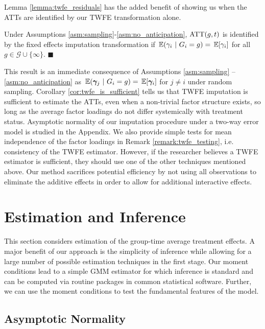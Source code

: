 \documentclass[12pt]{article}
\begin{document}
Lemma \ref{lemma:twfe_residuals} has the added benefit of showing us when the ATTs are identified by our TWFE transformation alone.
\begin{corollary}\label{cor:twfe_is_sufficient}
  Under Assumptions \ref{asm:sampling}-\ref{asm:no_anticipation}, $\text{ATT}(g,t)$ is identified by the fixed effects imputation transformation if $\expec{\gamma_i}{G_i=g} = \expec{\gamma_i}$ for all $g \in \mathcal{G} \cup \{\infty\}$. $\blacksquare$
\end{corollary}
This result is an immediate consequence of Assumptions \ref{asm:sampling} -- \ref{asm:no_anticipation} as $\expec{\bm \gamma_j}{G_i = g} = \expec{\bm \gamma_i}$ for $j \neq i$ under random sampling. 
Corollary \ref{cor:twfe_is_sufficient} tells us that TWFE imputation is sufficient to estimate the ATTs, even when a non-trivial factor structure exists, so long as the average factor loadings do not differ systemically with treatment status. Asymptotic normality of our imputation procedure under a two-way error model is studied in the Appendix. We also provide simple tests for mean independence of the factor loadings in Remark \ref{remark:twfe_testing}, i.e. consistency of the TWFE estimator. However, if the researcher believes a TWFE estimator is sufficient, they should use one of the other techniques mentioned above. Our method sacrifices potential efficiency by not using all observations to eliminate the additive effects in order to allow for additional interactive effects.



\section{Estimation and Inference}\label{sec:estimation}

This section considers estimation of the group-time average treatment effects. A major benefit of our approach is the simplicity of inference while allowing for a large number of possible estimation techniques in the first stage. Our moment conditions lead to a simple GMM estimator for which inference is standard and can be computed via routine packages in common statistical software. Further, we can use the moment conditions to test the fundamental features of the model.

\subsection{Asymptotic Normality}
\end{document}
